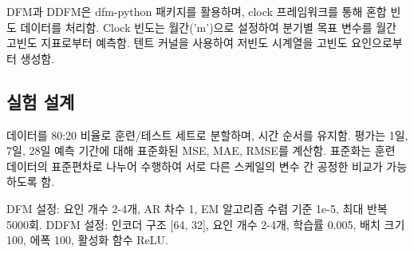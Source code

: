 DFM과 DDFM은 dfm-python 패키지를 활용하며, clock 프레임워크를 통해 혼합 빈도 데이터를 처리함. Clock 빈도는 월간('m')으로 설정하여 분기별 목표 변수를 월간 고빈도 지표로부터 예측함. 텐트 커널을 사용하여 저빈도 시계열을 고빈도 요인으로부터 생성함.

\subsection{실험 설계}

데이터를 80:20 비율로 훈련/테스트 세트로 분할하며, 시간 순서를 유지함. 평가는 1일, 7일, 28일 예측 기간에 대해 표준화된 MSE, MAE, RMSE를 계산함. 표준화는 훈련 데이터의 표준편차로 나누어 수행하여 서로 다른 스케일의 변수 간 공정한 비교가 가능하도록 함.

DFM 설정: 요인 개수 2-4개, AR 차수 1, EM 알고리즘 수렴 기준 1e-5, 최대 반복 5000회. DDFM 설정: 인코더 구조 [64, 32], 요인 개수 2-4개, 학습률 0.005, 배치 크기 100, 에폭 100, 활성화 함수 ReLU.


